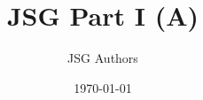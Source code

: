 \documentclass[11pt]{article}
\title{JSG Part I (A)}
\author{JSG Authors}
\date{\today}
\begin{document}
\maketitle

\newcommand{\JSGWrap}{A}








\nocite{*}
\printbibliography
\end{document}
